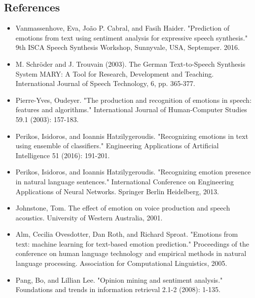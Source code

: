 \documentclass[oneside,a4paper,12pt]{book}
\begin{document}
\begin{appendices}

\chapter{References}
\begin{itemize}
	\item[\lbrack1\rbrack] Vanmassenhove, Eva, João P. Cabral, and Fasih Haider. "Prediction of emotions from text using sentiment analysis for expressive speech synthesis." 9th ISCA Speech Synthesis Workshop, Sunnyvale, USA, Septemper. 2016.
	
	\item[\lbrack2\rbrack] M. Schröder and J. Trouvain (2003). The German Text-to-Speech Synthesis System MARY: A Tool for Research, Development and Teaching. International Journal of Speech Technology, 6, pp. 365-377.
	
	\item[\lbrack3\rbrack] Pierre-Yves, Oudeyer. "The production and recognition of emotions in speech: 	features and algorithms." International Journal of Human-Computer Studies 59.1 	(2003): 157-183.
	
	\item[\lbrack4\rbrack] Perikos, Isidoros, and Ioannis Hatzilygeroudis. "Recognizing emotions in text using ensemble of classifiers." Engineering Applications of Artificial Intelligence 51 (2016): 191-201.
	
	\item[\lbrack5\rbrack] Perikos, Isidoros, and Ioannis Hatzilygeroudis. "Recognizing emotion presence in natural language sentences." International Conference on Engineering Applications of Neural Networks. Springer Berlin Heidelberg, 2013.
	
	\item[\lbrack6\rbrack] Johnstone, Tom. The effect of emotion on voice production and speech acoustics. 	University of Western Australia, 2001.
	
	\item[\lbrack7\rbrack] Alm, Cecilia Ovesdotter, Dan Roth, and Richard Sproat. "Emotions from text: 	machine learning for text-based emotion prediction." Proceedings of the conference 	on human language technology and empirical methods in natural language 	processing. Association for Computational Linguistics, 2005.
	
	\item[\lbrack8\rbrack] Pang, Bo, and Lillian Lee. "Opinion mining and sentiment analysis." Foundations 	and trends in information retrieval 2.1-2 (2008): 1-135.
	

\end{itemize}
\end{appendices}
\end{document}
